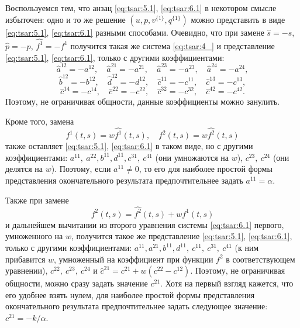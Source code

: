 Воспользуемся тем, что анзац \eqref{eq:tsar:5.1}, \eqref{eq:tsar:6.1} в
некотором смысле избыточен: одно и то же решение $(u,p,v^{\{1\}},q^{\{1\}})$ можно
представить в виде \eqref{eq:tsar:5.1}, \eqref{eq:tsar:6.1} разными способами.
Очевидно, что при замене $\hat{s}=-s$, $\hat{p}=-p$, ${\hat{{f^{1}}}=-{f^{1}}}$ получится такая же 
система \eqref{eq:tsar:4_} и представление \eqref{eq:tsar:5.1}, \eqref{eq:tsar:6.1}, только с другими коэффициентами:
$$\hat{a}^{12} = -a^{12},\quad  
\hat{a}^{21} = -a^{21},\quad  
\hat{a}^{23} = -a^{23},\quad 
\hat{a}^{24} = -a^{24},$$ 
$$\hat{b}^{12} = -b^{12},\quad  
\hat{d}^{12} = -d^{12},\quad  
\hat{c}^{11} = -c^{11}, \quad 
\hat{c}^{13} = -c^{13},$$ 
$$\hat{c}^{14} = -c^{14},\quad 
\hat{c}^{22} = -c^{22},\quad 
\hat{c}^{32} = -c^{32}, \quad
\hat{c}^{42} = -c^{42}.$$ 
Поэтому, не ограничивая общности, данные коэффициенты можно занулить.

Кроме того, замена $${f^1}(t,s) = w \hat{{f^1}}(t,s), \quad {f^2}(t,s) = w \hat{{f^2}}(t,s)$$ 
также оставляет \eqref{eq:tsar:5.1}, \eqref{eq:tsar:6.1} в таком
виде, но с другими коэффициентами: 
$a^{11},\: a^{22},b^{11},d^{11}, c^{31}, \:c^{41}$ 
(они умножаются на $w$), 
$c^{23}, \:c^{24}$ (они делятся на $w$). 
Поэтому, если $a^{11} \neq 0$, то его для наиболее простой формы
представления окончательного результата предпочтительнее задать $a^{11}= \alpha $.

Также при замене $${f^2}(t,s) = \hat{{f^2}}(t,s) + w {f^1}(t,s)$$ 
и дальнейшем вычитании из второго уравнения системы \eqref{eq:tsar:6.1} первого, умноженного на $w$, 
получится такое же представление
\eqref{eq:tsar:5.1}, \eqref{eq:tsar:6.1}, только с другими коэффициентами:
$a^{11},a^{21},b^{11},d^{11},\: c^{11},\: c^{31}, \:c^{41}$ 
(к ним прибавится $w$, умноженный на коэффициент при функции ${f^2}$ в соответствующем уравнении),
$c^{22},\:c^{23}, \:c^{24}$ и 
$\hat{c}^{21} = c^{21}+w(c^{22}-c^{12})$. 
Поэтому, не ограничивая общности, можно сразу задать значение $c^{21}$. 
Хотя на первый взгляд  кажется,
что его удобнее взять нулем, для наиболее простой формы
представления окончательного результата предпочтительнее задать
следующее значение: $c^{21}=-k / \alpha.$


